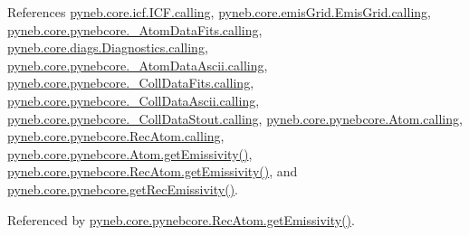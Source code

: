 References \hyperlink{icf_8py_source_l00016}{pyneb.\-core.\-icf.\-I\-C\-F.\-calling}, \hyperlink{emis_grid_8py_source_l00044}{pyneb.\-core.\-emis\-Grid.\-Emis\-Grid.\-calling}, \hyperlink{pynebcore_8py_source_l00097}{pyneb.\-core.\-pynebcore.\-\_\-\-Atom\-Data\-Fits.\-calling}, \hyperlink{diags_8py_source_l00169}{pyneb.\-core.\-diags.\-Diagnostics.\-calling}, \hyperlink{pynebcore_8py_source_l00318}{pyneb.\-core.\-pynebcore.\-\_\-\-Atom\-Data\-Ascii.\-calling}, \hyperlink{pynebcore_8py_source_l00585}{pyneb.\-core.\-pynebcore.\-\_\-\-Coll\-Data\-Fits.\-calling}, \hyperlink{pynebcore_8py_source_l00936}{pyneb.\-core.\-pynebcore.\-\_\-\-Coll\-Data\-Ascii.\-calling}, \hyperlink{pynebcore_8py_source_l01156}{pyneb.\-core.\-pynebcore.\-\_\-\-Coll\-Data\-Stout.\-calling}, \hyperlink{pynebcore_8py_source_l01229}{pyneb.\-core.\-pynebcore.\-Atom.\-calling}, \hyperlink{pynebcore_8py_source_l02643}{pyneb.\-core.\-pynebcore.\-Rec\-Atom.\-calling}, \hyperlink{pynebcore_8py_source_l01782}{pyneb.\-core.\-pynebcore.\-Atom.\-get\-Emissivity()}, \hyperlink{pynebcore_8py_source_l02990}{pyneb.\-core.\-pynebcore.\-Rec\-Atom.\-get\-Emissivity()}, and \hyperlink{pynebcore_8py_source_l03158}{pyneb.\-core.\-pynebcore.\-get\-Rec\-Emissivity()}.



Referenced by \hyperlink{pynebcore_8py_source_l02990}{pyneb.\-core.\-pynebcore.\-Rec\-Atom.\-get\-Emissivity()}.


